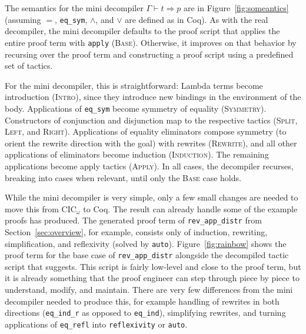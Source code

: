 The semantics for the mini decompiler $\Gamma \vdash t \Rightarrow p$ are in Figure~\ref{fig:someantics} (assuming $=$, \lstinline{eq_sym}, $\wedge$, and $\vee$ are defined as in Coq).
As with the real decompiler, the mini decompiler defaults to the proof script
that applies the entire proof term with \lstinline{apply} (\textsc{Base}).
Otherwise, it improves on that behavior by recursing over the proof term and constructing a proof script using a predefined set of tactics.

For the mini decompiler, this is straightforward: Lambda terms become introduction 	(\textsc{Intro}), since they introduce new bindings
in the environment of the body. Applications of \lstinline{eq_sym} become symmetry of equality (\textsc{Symmetry}).
Constructors of conjunction and disjunction map to the respective tactics (\textsc{Split}, \textsc{Left}, and \textsc{Right}).
Applications of equality eliminators compose symmetry (to orient the rewrite direction with the goal) with rewrites (\textsc{Rewrite}),
and all other applications of eliminators become induction (\textsc{Induction}).
The remaining applications become apply tactics (\textsc{Apply}).
In all cases, the decompiler recurses, breaking into cases when relevant, until only the \textsc{Base}
case holds. %

While the mini decompiler is very simple, only a few small changes are needed
to move this from CIC$_{\omega}$ to Coq.
The result can already handle some of the example proofs \toolname has produced.
The generated proof term of \lstinline{rev_app_distr} from Section~\ref{sec:overview},
for example, consists only of induction, rewriting, simplification, and reflexivity (solved by \lstinline{auto}).
Figure~\ref{fig:rainbow} shows the proof term for the base case of \lstinline{rev_app_distr} 
alongside the decompiled tactic script that \toolname suggests.
This script is fairly low-level and close to the proof term, but it is already something that the proof engineer
can step through piece by piece to understand, modify, and maintain.
There are very few differences from the mini decompiler needed to produce this,
for example handling of rewrites in both directions (\lstinline{eq_ind_r} as opposed to \lstinline{eq_ind}),
simplifying rewrites,
and turning applications of \lstinline{eq_refl} into \lstinline{reflexivity} or \lstinline{auto}.

